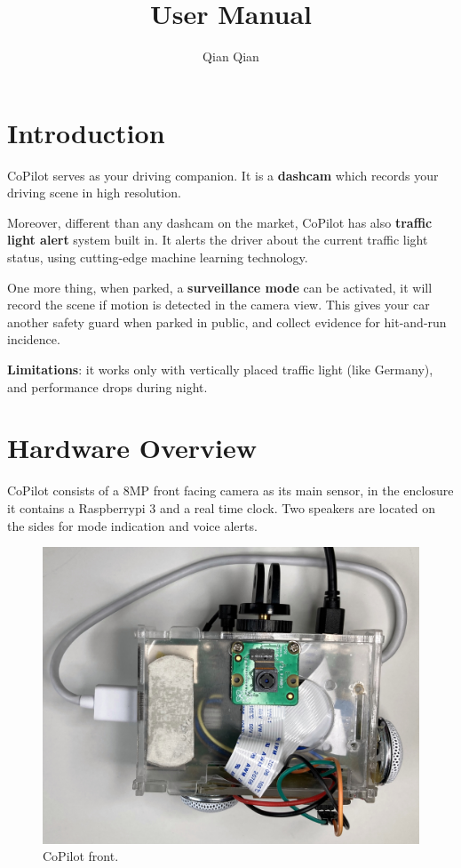 \documentclass[a4paper]{manual}
\title{User Manual}
\author{Qian Qian}
\begin{document}
\maketitle

\tableofcontents
\newpage

\section{Introduction}
CoPilot serves as your driving companion. It is a \textbf{dashcam} which records your driving scene in high resolution. 

Moreover, different than any dashcam on the market, CoPilot has also \textbf{traffic light alert} system built in. It alerts the driver about the current traffic light status, using cutting-edge machine learning technology. 

One more thing, when parked, a \textbf{surveillance mode} can be activated, it will record the scene if motion is detected in the camera view. This gives your car another safety guard when parked in public, and collect evidence for hit-and-run incidence.

\textbf{Limitations}: it works only with vertically placed traffic light (like Germany), and performance drops during night.

\section{Hardware Overview}
CoPilot consists of a 8MP front facing camera as its main sensor, in the enclosure it contains a Raspberrypi 3 and a real time clock. Two speakers are located on the sides for mode indication and voice alerts.
\begin{figure}[h!]
  \centering
  \includegraphics[width=.7\textwidth]{pics/front.jpg}
  \caption[]{CoPilot front.}
  \label{fig:front}
\end{figure}
\end{document}
